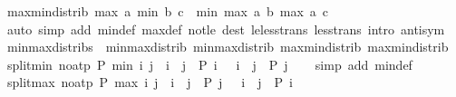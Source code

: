 \begin{isabellebody}
%
\isadelimproof
\isanewline
%
\endisadelimproof
\isanewline
{}\isamarkupfalse%
\ max{\isacharunderscore}{\kern0pt}min{\isacharunderscore}{\kern0pt}distrib{}{\isacharcolon}{\kern0pt}\ {\isachardoublequoteopen}max\ a\ {\isacharparenleft}{\kern0pt}min\ b\ c{\isacharparenright}{\kern0pt}\ {\isacharequal}{\kern0pt}\ min\ {\isacharparenleft}{\kern0pt}max\ a\ b{\isacharparenright}{\kern0pt}\ {\isacharparenleft}{\kern0pt}max\ a\ c{\isacharparenright}{\kern0pt}{\isachardoublequoteclose}\isanewline
%
\isadelimproof
\ \ %
\endisadelimproof
%
\isatagproof
{}\isamarkupfalse%
\ {\isacharparenleft}{\kern0pt}auto\ simp\ add{\isacharcolon}{\kern0pt}\ min{\isacharunderscore}{\kern0pt}def\ max{\isacharunderscore}{\kern0pt}def\ not{\isacharunderscore}{\kern0pt}le\ dest{\isacharcolon}{\kern0pt}\ le{\isacharunderscore}{\kern0pt}less{\isacharunderscore}{\kern0pt}trans\ less{\isacharunderscore}{\kern0pt}trans\ intro{\isacharcolon}{\kern0pt}\ antisym{\isacharparenright}{\kern0pt}%
\endisatagproof
{\isafoldproof}%
%
\isadelimproof
\isanewline
%
\endisadelimproof
\isanewline
{}\isamarkupfalse%
\ min{\isacharunderscore}{\kern0pt}max{\isacharunderscore}{\kern0pt}distribs\ {\isacharequal}{\kern0pt}\ min{\isacharunderscore}{\kern0pt}max{\isacharunderscore}{\kern0pt}distrib{}\ min{\isacharunderscore}{\kern0pt}max{\isacharunderscore}{\kern0pt}distrib{}\ max{\isacharunderscore}{\kern0pt}min{\isacharunderscore}{\kern0pt}distrib{}\ max{\isacharunderscore}{\kern0pt}min{\isacharunderscore}{\kern0pt}distrib{}\isanewline
\isanewline
{}\isamarkupfalse%
\ split{\isacharunderscore}{\kern0pt}min\ {\isacharbrackleft}{\kern0pt}no{\isacharunderscore}{\kern0pt}atp{\isacharbrackright}{\kern0pt}{\isacharcolon}{\kern0pt}\ {\isachardoublequoteopen}P\ {\isacharparenleft}{\kern0pt}min\ i\ j{\isacharparenright}{\kern0pt}\ {\isasymlongleftrightarrow}\ {\isacharparenleft}{\kern0pt}i\ {\isasymle}\ j\ {\isasymlongrightarrow}\ P\ i{\isacharparenright}{\kern0pt}\ {\isasymand}\ {\isacharparenleft}{\kern0pt}{\isasymnot}\ i\ {\isasymle}\ j\ {\isasymlongrightarrow}\ P\ j{\isacharparenright}{\kern0pt}{\isachardoublequoteclose}\isanewline
%
\isadelimproof
\ \ %
\endisadelimproof
%
\isatagproof
{}\isamarkupfalse%
\ {\isacharparenleft}{\kern0pt}simp\ add{\isacharcolon}{\kern0pt}\ min{\isacharunderscore}{\kern0pt}def{\isacharparenright}{\kern0pt}%
\endisatagproof
{\isafoldproof}%
%
\isadelimproof
\isanewline
%
\endisadelimproof
\isanewline
{}\isamarkupfalse%
\ split{\isacharunderscore}{\kern0pt}max\ {\isacharbrackleft}{\kern0pt}no{\isacharunderscore}{\kern0pt}atp{\isacharbrackright}{\kern0pt}{\isacharcolon}{\kern0pt}\ {\isachardoublequoteopen}P\ {\isacharparenleft}{\kern0pt}max\ i\ j{\isacharparenright}{\kern0pt}\ {\isasymlongleftrightarrow}\ {\isacharparenleft}{\kern0pt}i\ {\isasymle}\ j\ {\isasymlongrightarrow}\ P\ j{\isacharparenright}{\kern0pt}\ {\isasymand}\ {\isacharparenleft}{\kern0pt}{\isasymnot}\ i\ {\isasymle}\ j\ {\isasymlongrightarrow}\ P\ i{\isacharparenright}{\kern0pt}{\isachardoublequoteclose}\isanewline

\end{isabellebody}
